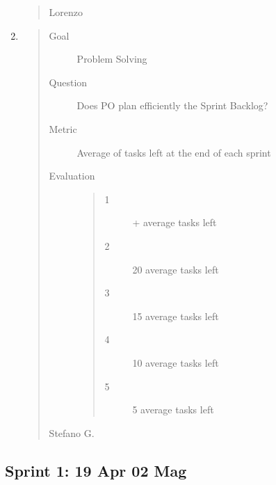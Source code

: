 \documentclass[letterpaper,10pt,italian]{sphinxmanual}
\begin{document}
\begin{enumerate}
\begin{quote}
\begin{description}
\item[{Lorenzo}] \leavevmode
{}

\end{description}\end{quote}

\item {} \begin{quote}\begin{description}
\item[{Goal}] \leavevmode
\sphinxAtStartPar
Problem Solving

\item[{Question}] \leavevmode
\sphinxAtStartPar
Does PO plan efficiently the Sprint Backlog?

\item[{Metric}] \leavevmode
\sphinxAtStartPar
Average of tasks left at the end of each sprint

\item[{Evaluation}] \leavevmode\begin{quote}\begin{description}
\item[{1}] \leavevmode
{}+ average tasks left

\item[{2}] \leavevmode
{}\sphinxhyphen{}20 average tasks left

\item[{3}] \leavevmode
{}\sphinxhyphen{}15 average tasks left

\item[{4}] \leavevmode
{}\sphinxhyphen{}10 average tasks left

\item[{5}] \leavevmode
{}\sphinxhyphen{}5 average tasks left

\end{description}\end{quote}

\item[{Stefano G.}] \leavevmode
{}

\end{description}\end{quote}

\end{enumerate}


\subsection{Sprint 1: 19 Apr \sphinxhyphen{} 02 Mag}
\label{\detokenize{development/sprint1/index:sprint-1-19-apr-02-mag}}\label{\detokenize{development/sprint1/index::doc}}
\end{document}
